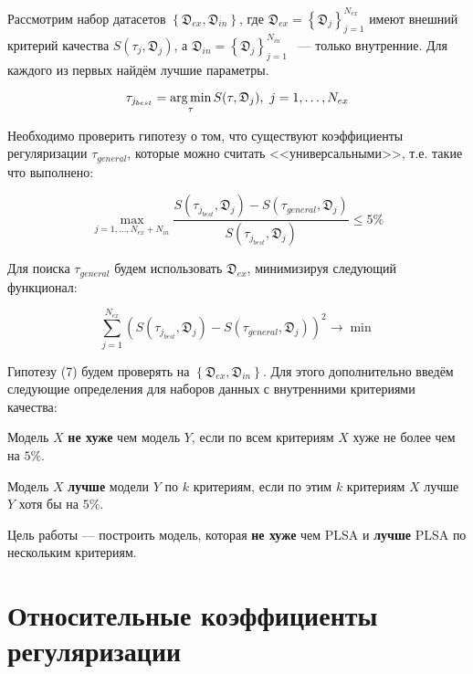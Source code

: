 \documentclass[12pt,twoside]{article}
\begin{document}
	Рассмотрим набор датасетов $\left\{\mathfrak{D}_{ex}, \mathfrak{D}_{in}\right\}$, где  $\mathfrak{D}_{ex} = \left\{\mathfrak{D}_j\right\}_{j=1}^{N_{ex}}$ имеют внешний критерий качества $S(\tau_j, \mathfrak{D}_j)$, а $\mathfrak{D}_{in} = \left\{\mathfrak{D}_j\right\}_{j=1}^{N_{in}}$~ --- только внутренние. Для каждого из первых найдём лучшие параметры.
	
	\begin{equation}
	\tau_{j_{best}} = \argmin_{\tau} S(\tau, \mathfrak{D}_j) ,\ j = 1,\dots , N_{ex}
	\end{equation}
	
	Необходимо проверить гипотезу о том, что существуют коэффициенты регуляризации $\tau_{general}$, которые можно считать <<универсальными>>, т.е. такие что выполнено:
	
	\begin{equation}
	\max_{j=1,\dots,N_{ex}+N_{in}} \frac{S(\tau_{j_{best}}, \mathfrak{D}_j)- S(\tau_{general}, \mathfrak{D}_j)}{S(\tau_{j_{best}}, \mathfrak{D}_j)} \leq 5\%
	\end{equation}
	
	Для поиска $\tau_{general}$ будем использовать $\mathfrak{D}_{ex}$, минимизируя следующий функционал:
	
	\begin{equation}
	\sum_{j=1}^{N_{ex}} \left(S(\tau_{j_{best}}, \mathfrak{D}_j)- S(\tau_{general}, \mathfrak{D}_j)\right)^2 \to \min
	\end{equation}
	
	Гипотезу (7) будем проверять на $\left\{\mathfrak{D}_{ex}, \mathfrak{D}_{in}\right\}$. Для этого дополнительно введём следующие определения для наборов данных с внутренними критериями качества:
	
	\begin{Def}
		Модель $X$ {\bf не хуже} чем модель $Y$, если по всем критериям $X$ хуже не более чем на $5\%$.
	\end{Def}
	
	\begin{Def}
		Модель $X$ {\bf лучше} модели $Y$ по $k$ критериям, если по этим $k$ критериям $X$ лучше $Y$ хотя бы на $5\%$.
	\end{Def}
	
	Цель работы --- построить модель, которая {\bf не хуже} чем PLSA\cite{Hofmann:1999:PLS:2073796.2073829} и {\bf лучше} PLSA по нескольким критериям.
	
	\newpage
	
	\section{Относительные коэффициенты регуляризации}
	
\end{document}
